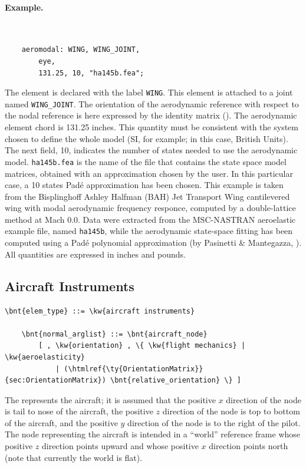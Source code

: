 \paragraph{Example.} \
\begin{verbatim}
    aeromodal: WING, WING_JOINT,
        eye,
        131.25, 10, "ha145b.fea";
\end{verbatim}
The  element is declared with the label \texttt{WING}.
This element is attached to a \kw{modal} joint 
named \texttt{WING\_JOINT}.
The orientation of the aerodynamic reference with respect 
to the nodal reference is here expressed by the identity matrix ().
The aerodynamic element chord is 131.25 inches.
This quantity must be consistent with the system chosen to define 
the whole model (SI, for example; in this case, British Units).
The next field, 10, indicates the number of states needed to use 
the aerodynamic model.
\texttt{ha145b.fea} is the name of the file that contains
the state space model matrices, obtained with an approximation 
chosen by the user.
In this particular case, a 10 states Pad\'e approximation 
has been chosen.
This example is taken from the Bisplinghoff Ashley Halfman
(BAH) Jet Transport Wing cantilevered wing with modal aerodynamic 
frequency responce, computed by a double-lattice method at Mach 0.0.
Data were extracted from the MSC-NASTRAN aeroelastic example file, 
named \texttt{ha145b}, while the aerodynamic state-space fitting 
has been computed using a Pad\'e polynomial approximation
(by Pasinetti \& Mantegazza, \cite{PASINETTI-MANTEGAZZA-1999}).
All quantities are expressed in inches and pounds.



\subsection{Aircraft Instruments}
\begin{Verbatim}[commandchars=\\\{\}]
    \bnt{elem_type} ::= \kw{aircraft instruments}

    \bnt{normal_arglist} ::= \bnt{aircraft_node}
        [ , \kw{orientation} , \{ \kw{flight mechanics} | \kw{aeroelasticity}
            | (\htmlref{\ty{OrientationMatrix}}{sec:OrientationMatrix}) \bnt{relative_orientation} \} ]
\end{Verbatim}
The  represents the aircraft; it is assumed
that the positive $x$ direction of the node is tail to nose of the aircraft,
the positive $z$ direction of the node is top to bottom of the aircraft,
and the positive $y$ direction of the node is to the right of the pilot.
The node representing the aircraft is intended in a ``world''
reference frame whose positive $z$ direction points upward
and whose positive $x$ direction points north
(note that currently the world is flat).

